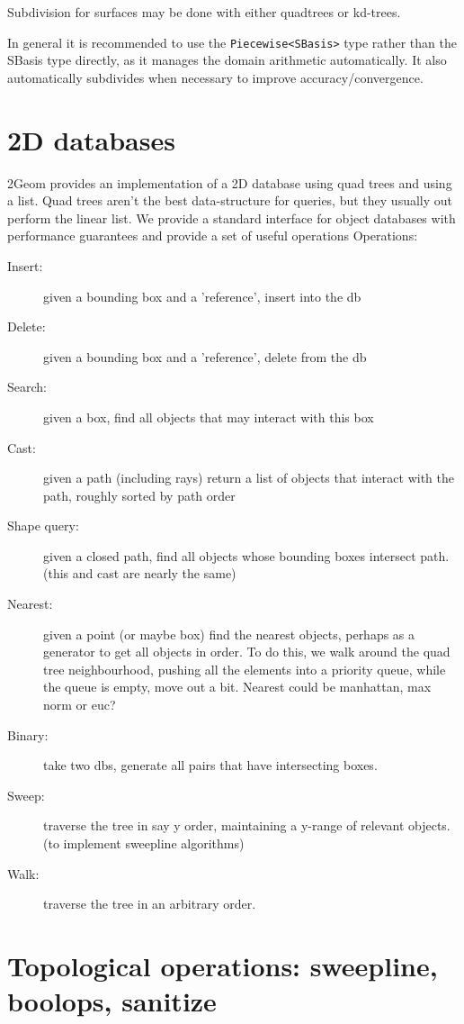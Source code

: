\documentclass[openany]{book}
\begin{document}
Subdivision for surfaces may be done with either quadtrees or kd-trees.

In general it is recommended to use the \verb|Piecewise<SBasis>| type rather than the SBasis type directly, as it manages the domain arithmetic automatically.  It also automatically subdivides when necessary to improve accuracy/convergence.

\chapter{2D databases}

2Geom provides an implementation of a 2D database using quad trees and
using a list.  Quad trees aren't the best data-structure for queries,
but they usually out perform the linear list.  We provide a
standard interface for object databases with performance guarantees
and provide a set of useful operations Operations:

\begin{description}
\item[Insert:] given a bounding box and a 'reference', insert into the db
\item[Delete:] given a bounding box and a 'reference', delete from the db
\item[Search:] given a box, find all objects that may interact with this box
\item[Cast:] given a path (including rays) return a list of objects that interact with the path, roughly sorted by path order
\item[Shape query:] given a closed path, find all objects whose bounding boxes intersect path.  (this and cast are nearly the same)
\item[Nearest:] given a point (or maybe box) find the nearest objects, perhaps as a generator to get all objects in order.  To do this, we walk around the quad tree neighbourhood, pushing all the elements into a priority queue, while the queue is empty, move out a bit.  Nearest could be manhattan, max norm or euc?
\item[Binary:] take two dbs, generate all pairs that have intersecting boxes.
\item[Sweep:] traverse the tree in say y order, maintaining a y-range of relevant objects. (to implement sweepline algorithms)
\item[Walk:] traverse the tree in an arbitrary order.
\end{description}

\chapter{Topological operations: sweepline, boolops, sanitize}
\end{document}

